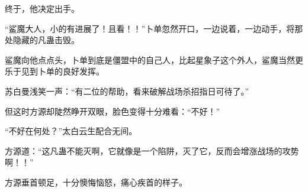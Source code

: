 \begin{this_body}
终于，他决定出手。

“鲨魔大人，小的有进展了！且看！！”卜单忽然开口，一边说着，一边动手，将那处隐藏的凡蛊击毁。

鲨魔向他点点头，卜单到底是僵盟中的自己人，比起星象子这个外人，鲨魔当然更乐于见到卜单的良好发挥。

苏白曼浅笑一声：“有二位的帮助，看来破解战场杀招指日可待了。”

但这时方源却陡然睁开双眼，脸色变得十分难看：“不好！”

“不好在何处？”太白云生配合无间。

方源道：“这凡蛊不能灭啊，它就像是一个陷阱，灭了它，反而会增涨战场的攻势啊！！”

方源垂首顿足，十分懊悔恼怒，痛心疾首的样子。

\end{this_body}

